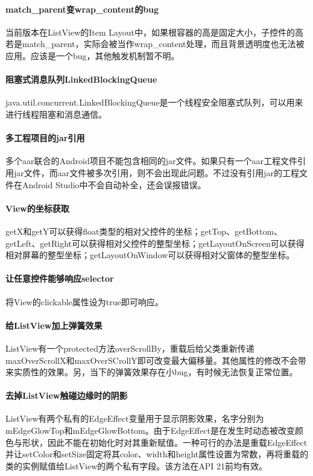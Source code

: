 \documentclass[UTF8]{ctexart}
\begin{document}
    \paragraph{match_parent变wrap_content的bug}
    当前版本在ListView的Item Layout中，如果根容器的高是固定大小，子控件的高若是match_parent，实际会被当作wrap_content处理，而且背景透明度也无法被应用。应该是一个bug，其他触发机制暂不明。
    \paragraph{阻塞式消息队列LinkedBlockingQueue}
    java.util.concurrent.LinkedBlockingQueue是一个线程安全阻塞式队列，可以用来进行线程阻塞和消息通信。
    \paragraph{多工程项目的jar引用}
    多个aar联合的Android项目不能包含相同的jar文件。如果只有一个aar工程文件引用jar文件，而aar文件被多次引用，则不会出现此问题。不过没有引用jar的工程文件在Android Studio中不会自动补全，还会误报错误。
    \paragraph{View的坐标获取}
    getX和getY可以获得float类型的相对父控件的坐标；getTop、getBottom、getLeft、getRight可以获得相对父控件的整型坐标；getLayoutOnScreen可以获得相对屏幕的整型坐标；getLayoutOnWindow可以获得相对父窗体的整型坐标。
    \paragraph{让任意控件能够响应selector}
    将View的clickable属性设为true即可响应。
    \paragraph{给ListView加上弹簧效果}
    ListView有一个protected方法overScrollBy，重载后给父类重新传递maxOverScrollX和maxOverSCrollY即可改变最大偏移量。其他属性的修改不会带来实质性的效果。另，当下的弹簧效果存在小bug，有时候无法恢复正常位置。
    \paragraph{去掉ListView触碰边缘时的阴影}
    ListView有两个私有的EdgeEffect变量用于显示阴影效果，名字分别为mEdgeGlowTop和mEdgeGlowBottom。由于EdgeEffect是在发生时动态被改变颜色与形状，因此不能在初始化时对其重新赋值。一种可行的办法是重载EdgeEffect并让setColor和setSize固定将其color、width和height属性设置为常数，再将重载的类的实例赋值给ListView的两个私有字段。该方法在API 21前均有效。
\end{document}
